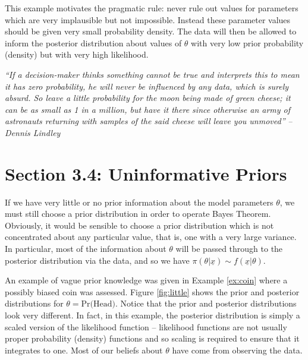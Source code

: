 This example motivates the pragmatic rule:
never rule out values for parameters which are very implausible but not impossible.
Instead these parameter values should be given very small probability density.
The data will then be allowed to inform the posterior distribution about values of $\theta$
with very low prior probability (density) but with very high likelihood.

\begin{tcolorbox}[colback=niceblue, colframe=niceblue]
\noindent \textit{``If a decision-maker thinks something cannot be true and interprets this to mean it has zero probability, he will never be influenced by any data, which is surely absurd. So leave a little probability for the moon being made of green cheese; it can be as small as 1 in a million, but have it there since otherwise an army of astronauts returning with samples of the said cheese will leave you unmoved''} \emph{-- Dennis Lindley}
\end{tcolorbox}

\clearpage
\section{Section 3.4: Uninformative Priors}
If we have very little or no prior information about the model parameters $\theta$, we must still choose a prior distribution in order to operate Bayes Theorem. Obviously, it would be sensible to choose a prior distribution which is not concentrated about any particular value, that is, one with a very large variance. In particular, most of the information about $\theta$ will be passed through to the posterior distribution via the data, and so we have $\pi(\theta|\underline{x})\sim f(\underline{x}|\theta)$.

An example of vague prior knowledge was given in Example \ref{ex:coin} where a possibly biased coin was assessed. Figure \ref{fig:little} shows the prior and posterior distributions for $\theta=\text{Pr(Head)}$. Notice that the prior and posterior distributions look very different. In fact, in this example, the posterior distribution is simply a scaled version of the likelihood function -- likelihood functions are not usually proper probability (density) functions and so scaling is required to ensure that it integrates to one. Most of our beliefs about $\theta$ have come from observing the data.

